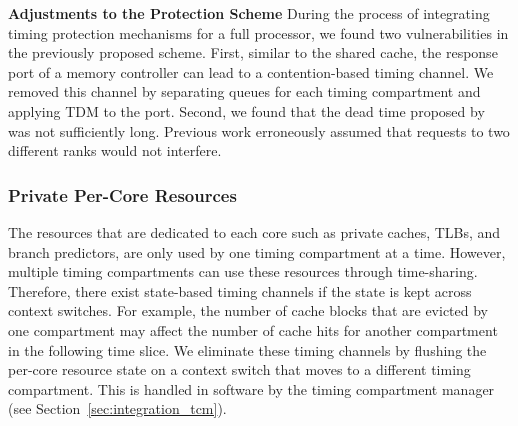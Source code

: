 \textbf{Adjustments to the Protection Scheme}
During the process of integrating timing protection mechanisms for a full
processor, we found two vulnerabilities in the previously proposed scheme.
First, similar to the shared cache, the response port of a memory controller
can lead to a contention-based timing channel. We removed this channel by
separating queues for each timing compartment and applying TDM to the port.
Second, we found that the dead time proposed by ~\cite{ushpca14} was 
not sufficiently long. Previous work erroneously assumed that requests to two
different ranks would not interfere.

\subsubsection{Private Per-Core Resources}

The resources that are dedicated to each core such as private caches,
TLBs, and branch predictors, are only used by one timing compartment at a time.
However, multiple timing compartments can use these resources through 
time-sharing. Therefore, there exist state-based timing channels if the state is
kept across context switches. For example, the number of cache blocks that
are evicted by one compartment may affect the number of cache hits for
another compartment in the following time slice.
We eliminate these timing channels by flushing the per-core resource state 
on a context switch that moves to a different timing compartment.
This is handled in software by the timing compartment 
manager (see Section~\ref{sec:integration_tcm}).


